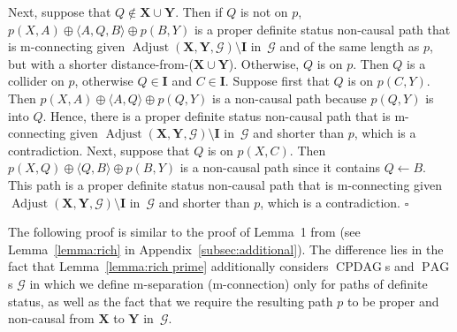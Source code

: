 \documentclass[11pt,a4paper]{article}
\newenvironment{proofof}[1][]{\begin{trivlist}
   \item[\hskip \labelsep {\bfseries Proof of #1.}]}{\hfill{}$\square$\end{trivlist}}
\DeclareMathOperator{\CPDAG}{CPDAG}
\DeclareMathOperator{\PAG}{PAG}
\DeclareMathOperator{\Adjust}{Adjust}
\newcommand{\g}[1][G]{\mathcal{#1}}
\newcommand{\adjustb}[2][X,Y]{\Adjust(\mathbf{#1},#2)}
\begin{document}
\begin{proofof}[Lemma~\ref{lemma:general path proof}]
Next, suppose that $Q \notin \mathbf{X} \cup \mathbf{Y}$. Then if $Q$ is not on $p$, $p(X,A) \oplus \langle A,Q,B \rangle \oplus p(B,Y)$ is a proper definite status non-causal path that is m-connecting given $\adjustb{\g} \setminus \mathbf{I}$ in~$\g$ and of the same length as $p$, but with a shorter distance-from-($\mathbf{X} \cup \mathbf{Y}$).
Otherwise, $Q$ is on $p$. Then $Q$ is a collider on $p$, otherwise $Q \in \mathbf{I}$ and $C \in \mathbf{I}$. Suppose first that $Q$ is on $p(C,Y)$. Then  $p(X,A) \oplus \langle A,Q \rangle \oplus p(Q,Y)$ is a non-causal path because $p(Q,Y)$ is into $Q$. Hence, there is a proper definite status non-causal path that is m-connecting given $\adjustb{\g} \setminus \mathbf{I}$ in~$\g$ and shorter than $p$, which is a contradiction. Next, suppose that $Q$ is on $p(X,C)$. Then $p(X,Q) \oplus \langle Q,B \rangle \oplus p(B,Y)$ is a non-causal path since it contains $Q \leftarrow B$. This path is a proper definite status non-causal path that is m-connecting given $\adjustb{\g} \setminus \mathbf{I}$ in~$\g$ and shorter than $p$, which is a contradiction.
\end{proofof}

The following proof is similar to the proof of Lemma~1 from \citet{richardson2003markov} (see Lemma~\ref{lemma:rich} in Appendix~\ref{subsec:additional}). The difference lies in the fact that Lemma~\ref{lemma:rich prime} additionally considers $\CPDAG$s and $\PAG$s $\g$ in which we define m-separation (m-connection) only for paths of definite status, as well as the fact that we require the resulting path $p$ to be proper and non-causal from $\mathbf{X}$ to $\mathbf{Y}$ in~$\g$.
\end{document}
